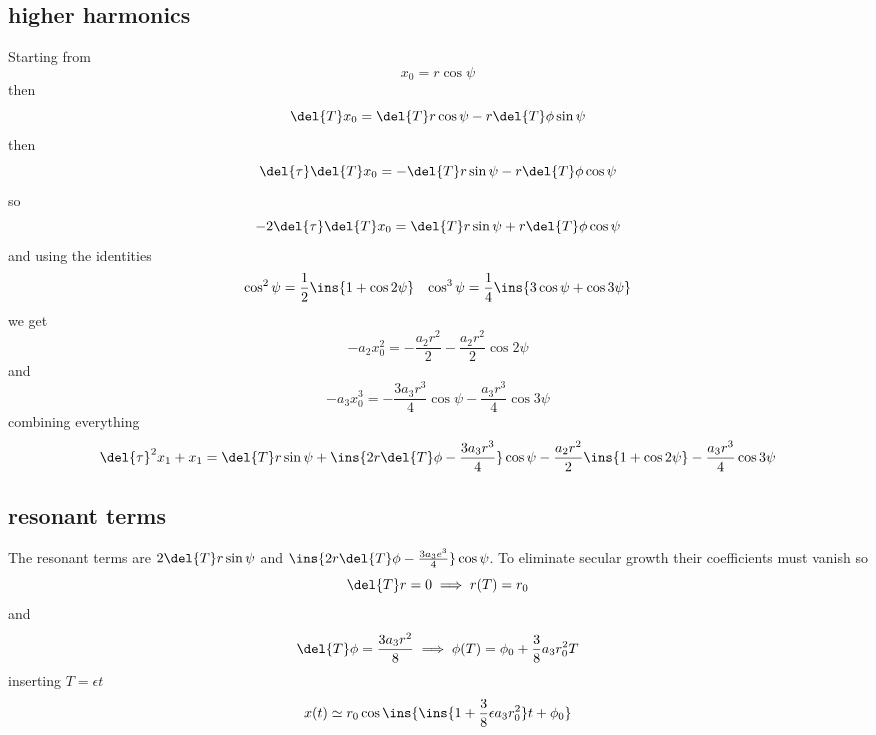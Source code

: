\subsection{higher harmonics}
Starting from 
\begin{equation}
    x_0 = r\cos\psi
\end{equation}
then 
\begin{equation}
    \del{T}x_0 = \del{T}r\cos\psi-r\del{T}\phi\sin\psi
\end{equation}
then 
\begin{equation}
    \del{\tau}\del{T}x_0 = -\del{T}r\sin\psi-r\del{T}\phi\cos\psi
\end{equation}
so 
\begin{equation}
    -2\del{\tau}\del{T}x_0 = \del{T}r\sin\psi+r\del{T}\phi\cos\psi
\end{equation}
and using the identities
\begin{align}
    \cos^2\psi=\frac{1}{2}\ins{1+\cos2\psi} && \cos^3\psi=\frac{1}{4}\ins{3\cos\psi+\cos3\psi}
\end{align}
we get 
\begin{equation}
    -a_2x_0^2=-\frac{a_2r^2}{2}-\frac{a_2r^2}{2}\cos2\psi
\end{equation}
and 
\begin{equation}
    -a_3x_0^3=-\frac{3a_3r^3}{4}\cos\psi-\frac{a_3r^3}{4}\cos3\psi
\end{equation}
combining everything
\begin{equation}
    \del{\tau}^2x_1+x_1 = \del{T}r\sin\psi+\ins{2r\del{T}\phi-\frac{3a_3r^3}{4}}\cos\psi-\frac{a_2r^2}{2}\ins{1+\cos2\psi}-\frac{a_3r^3}{4}\cos3\psi
\end{equation}
\subsection{resonant terms}
The resonant terms are \(2\del{T}r\sin\psi\) and \(\ins{2r\del{T}\phi-\frac{3a_3e^3}{4}}\cos\psi\). To eliminate secular growth their coefficients must vanish so 
\begin{equation}
    \del{T}r=0 \implies r(T)=r_0
\end{equation}
and
\begin{equation}
    \del{T}\phi=\frac{3a_3r^2}{8} \implies \phi(T)=\phi_0+\frac{3}{8}a_3r_0^2T
\end{equation}
inserting \(T=\epsilon t\)
\begin{equation}
    x(t) \simeq r_0\cos\ins{\ins{1+\frac{3}{8}\epsilon a_3 r_0^2}t+\phi_0}
\end{equation}
